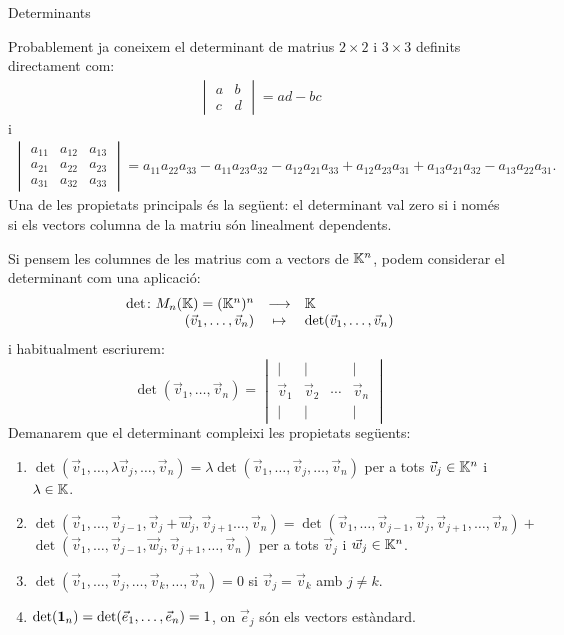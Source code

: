 \documentclass[
  11pt,
]{book}
\makeatletter
\numberwithin{dummy}{section}
\theoremstyle{maincolornumbox}
\theoremstyle{blacknumex}
\theoremstyle{blacknumbox}
\theoremstyle{maincolornum}
\renewcommand{\section}{\@startsection{section}{1}{\z@}
{-4ex \@plus -1ex \@minus -.4ex}
{1ex \@plus.2ex }
{\normalfont\large\sffamily\bfseries}}
\makeatother
\begin{document}
\hypertarget{determinants}{%
\section{Determinants}\label{determinants}}

Probablement ja coneixem el determinant de matrius \(2\times 2\) i
\(3\times 3\) definits directament com: \begin{align}
\label{eq:det2}
\begin{vmatrix}
a & b \\ c & d  
\end{vmatrix}= ad -bc
\end{align} i \begin{align}
\label{eq:det3}
\begin{vmatrix}
a_{11} & a_{12} & a_{13}\\
a_{21} & a_{22} & a_{23}\\
a_{31} & a_{32} & a_{33}
\end{vmatrix} = a_{11}a_{22}a_{33}-a_{11}a_{23}a_{32}-a_{12}a_{21}a_{33}+a_{12}a_{23}a_{31}+a_{13}a_{21}a_{32}-a_{13}a_{22}a_{31}.
\end{align} Una de les propietats principals és la següent: el
determinant val zero si i només si els vectors columna de la matriu són
linealment dependents.

Si pensem les columnes de les matrius com a vectors de \(\mathbb{K}^n\), podem
considerar el determinant com una aplicació: \[\begin{array}{rcl}
\det \colon M_n(\mathbb{K})=(\mathbb{K}^n)^n & \longrightarrow & \mathbb{K} \\
(\vec v_1, \dots , \vec v_n) & \mapsto & \det(\vec v_1, \dots , \vec v_n)
\end{array}\] i habitualment escriurem:
\[\det(\vec v_1, \dots, \vec v_n)=\begin{vmatrix}
\mid & \mid & & \mid \\
\vec v_1 & \vec v_2 & \cdots & \vec v_n \\
\mid & \mid & & \mid
\end{vmatrix}\] Demanarem que el determinant compleixi les propietats
següents:

\begin{enumerate}
\def\labelenumi{\arabic{enumi}.}
\item
  \(\det(\vec v_1, \dots, \lambda \vec v_j, \dots,\vec v_n)=\lambda \det(\vec v_1, \dots, \vec v_j, \dots,\vec v_n)\)
  per a tots \(\vec v_j\in \mathbb{K}^n\) i \(\lambda \in \mathbb{K}\).
\item
  \(\det(\vec v_1, \dots, \vec v_{j-1}, \vec v_j+\vec w_j, \vec v_{j+1} \dots,\vec v_n)= \det(\vec v_1, \dots, \vec v_{j-1},\vec v_j,\vec v_{j+1}, \dots,\vec v_n) +\)\\
  \(\det(\vec v_1, \dots, \vec v_{j-1},\vec w_j,\vec v_{j+1}, \dots,\vec v_n)\)
  per a tots \(\vec v_j\) i \(\vec w_j\in \mathbb{K}^n\).
\item
  \(\det(\vec v_1,\dots , \vec v_j, \dots, \vec v_k, \dots ,\vec v_n)=0\)
  si \(\vec v_j=\vec v_k\) amb \(j\neq k\).
\item
  \(\det(\mathbf{1}_n)=\det(\vec e_1, \dots, \vec e_n)=1\), on \(\vec e_j\) són
  els vectors estàndard.
\end{enumerate}
\end{document}
